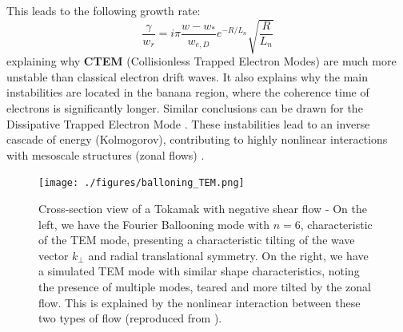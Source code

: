 \documentclass[11pt,openany]{report}
\begin{document}
\begin{multicols}{2}
    This leads to the following growth rate:
    $$\frac{\gamma}{w_r} = i \pi \frac{w - w_*}{w_{e,D}} e^{-R/L_n} \sqrt{\frac{R}{L_n}}$$
    explaining why \textbf{CTEM} (Collisionless Trapped Electron Modes) are much more unstable than classical electron drift waves. It also explains why the main instabilities are located in the banana region, where the coherence time of electrons is significantly longer. Similar conclusions can be drawn for the Dissipative Trapped Electron Mode \cite{Trapped_Particle_Mode}. These instabilities lead to an inverse cascade of energy (Kolmogorov), contributing to highly nonlinear interactions with mesoscale structures (zonal flows) \cite{San_diego, Krutkin_thesis, DW_transport}.
\end{multicols}
\begin{figure}[H]
    \centering
    \texttt{[image: ./figures/balloning\_TEM.png]}
    \caption{Cross-section view of a Tokamak with negative shear flow - On the left, we have the Fourier Ballooning mode with \( n = 6 \), characteristic of the TEM mode, presenting a characteristic tilting of the wave vector \( k_{\perp} \) and radial translational symmetry. On the right, we have a simulated TEM mode with similar shape characteristics, noting the presence of multiple modes, teared and more tilted by the zonal flow. This is explained by the nonlinear interaction between these two types of flow (reproduced from \cite{TEM_simulation, Ballooning_transform}).}
    \label{}
\end{figure}
\end{document}
